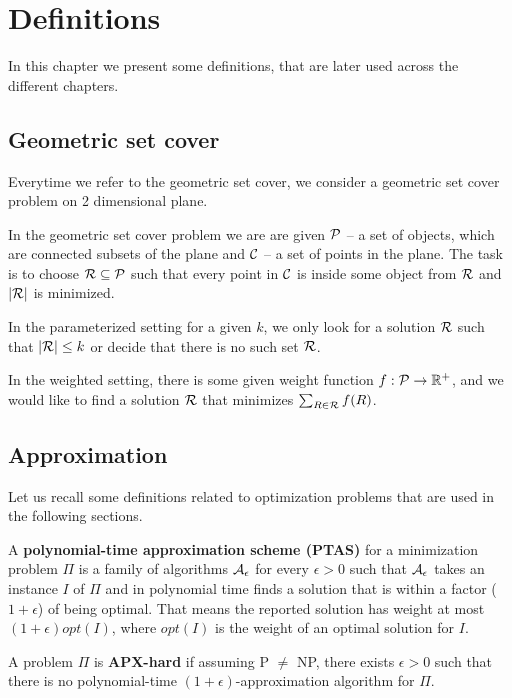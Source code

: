 \chapter{Definitions}

In this chapter we present some definitions, that are later used
across the different chapters.

\section{Geometric set cover}
Everytime we refer to the geometric set cover,
we consider a geometric set cover problem on
2 dimensional plane.

In the geometric set cover problem we are are given
$\mathcal{P}$ -- a set of objects, which are connected
subsets of the plane and $\mathcal{C}$ -- a set of points in the plane.
The task is to choose $\mathcal{R} \subseteq \mathcal{P}$ such that
every point in $\mathcal{C}$ is inside some object from $\mathcal{R}$
and $|\mathcal{R}|$ is minimized.

In the parameterized setting for a given $k$,
we only look for a solution $\mathcal{R}$ such that $|\mathcal{R}| \le k$
or decide that there is no such set $\mathcal{R}$.

In the weighted setting, there is some given weight function
$f : \mathcal{P} \rightarrow \mathbb{R^+}$,
and we would like to find a solution $\mathcal{R}$
that minimizes $\sum_{R \in \mathcal{R}} f(R)$.

\section{Approximation}

Let us recall some definitions related to optimization problems
that are used in the following sections.

\begin{defi}
A \textbf{polynomial-time approximation scheme (PTAS)}
for a minimization problem $\Pi$
is a family of algorithms $\cal{A}_\epsilon$ for
every $\epsilon > 0$
such that $\cal{A}_\epsilon$ takes an instance $I$ of $\Pi$
and in polynomial time
finds a solution that is within a factor
($1+\epsilon$) of being optimal.
That means the reported solution has weight at most
$(1+\epsilon)opt(I)$, where $opt(I)$ is the weight
of an optimal solution for $I$.
\end{defi}

\begin{defi}
A problem $\Pi$ is \textbf{APX-hard} if assuming P $\neq$ NP,
there exists $\epsilon > 0$
such that there is no polynomial-time $(1+\epsilon)$-approximation algorithm
for $\Pi$.
\end{defi}

